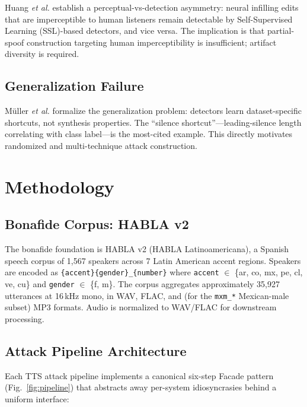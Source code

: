 \documentclass[conference]{IEEEtran}
\begin{document}
Huang \emph{et al.} \cite{huang2024detectable} establish a perceptual-vs-detection asymmetry: neural infilling edits that are imperceptible to human listeners remain detectable by Self-Supervised Learning (SSL)-based detectors, and vice versa. The implication is that partial-spoof construction targeting human imperceptibility is insufficient; artifact diversity is required.

\subsection{Generalization Failure}

M\"uller \emph{et al.} \cite{muller2022generalize, muller2024harder} formalize the generalization problem: detectors learn dataset-specific shortcuts, not synthesis properties. The ``silence shortcut''---leading-silence length correlating with class label---is the most-cited example. This directly motivates randomized and multi-technique attack construction.

\section{Methodology}

\subsection{Bonafide Corpus: HABLA v2}

The bonafide foundation is HABLA v2 (HABLA Latinoamericana), a Spanish speech corpus of 1{,}567 speakers across 7 Latin American accent regions. Speakers are encoded as \texttt{\{accent\}\{gender\}\_\{number\}} where \texttt{accent} $\in$ \{ar, co, mx, pe, cl, ve, cu\} and \texttt{gender} $\in$ \{f, m\}. The corpus aggregates approximately 35{,}927 utterances at 16\,kHz mono, in WAV, FLAC, and (for the \texttt{mxm\_*} Mexican-male subset) MP3 formats. Audio is normalized to WAV/FLAC for downstream processing.

\subsection{Attack Pipeline Architecture}

Each TTS attack pipeline implements a canonical six-step Facade pattern (Fig.~\ref{fig:pipeline}) that abstracts away per-system idiosyncrasies behind a uniform interface:
\end{document}
